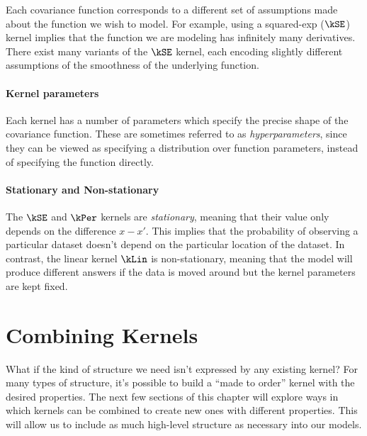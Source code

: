 Each covariance function corresponds to a different set of assumptions made about the function we wish to model.
For example, using a squared-exp ($\kSE$) kernel implies that the function we are modeling has infinitely many derivatives.
There exist many variants of the $\kSE$ kernel, each encoding slightly different assumptions of the smoothness of the underlying function.

\paragraph{Kernel parameters}
Each kernel has a number of parameters which specify the precise shape of the covariance function.
These are sometimes referred to as \emph{hyperparameters}, since they can be viewed as specifying a distribution over function parameters, instead of specifying the function directly.


\paragraph{Stationary and Non-stationary}
The $\kSE$ and $\kPer$ kernels are \emph{stationary}, meaning that their value only depends on the difference $x-x'$.  This implies that the probability of observing a particular dataset doesn't depend on the particular location of the dataset.
In contrast, the linear kernel $\kLin$ is non-stationary, meaning that the model will produce different answers if the data is moved around but the kernel parameters are kept fixed.




\section{Combining Kernels}

What if the kind of structure we need isn't expressed by any existing kernel?
For many types of structure, it's possible to build a ``made to order'' kernel with the desired properties.
The next few sections of this chapter will explore ways in which kernels can be combined to create new ones with different properties.
This will allow us to include as much high-level structure as necessary into our models.


